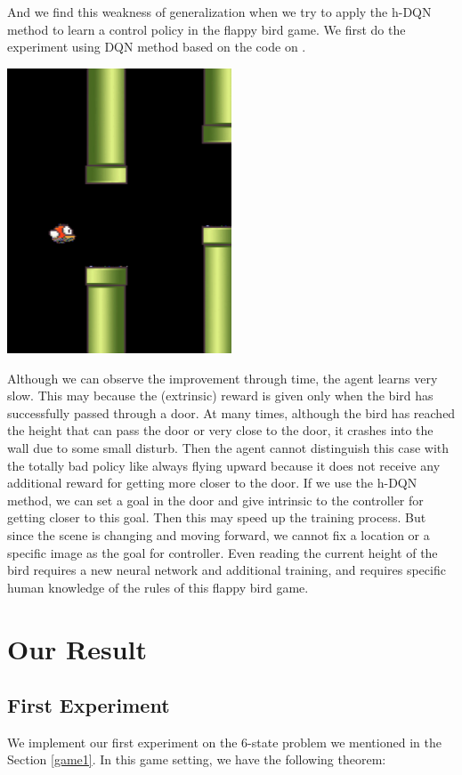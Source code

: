 \documentclass{article}
\begin{document}
\begin{spacing}{1.1}
    And we find this weakness of generalization when we try to apply the h-DQN method to learn a control policy in the flappy bird game. We first do the experiment using DQN method based on the code on \cite{github2}.
    \begin{center}
        \includegraphics[width = 0.5\textwidth]{Fluppy.png}
    \end{center}

    Although we can observe the improvement through time, the agent learns very slow. This may because the (extrinsic) reward is given only when the bird has successfully passed through a door. At many times, although the bird has reached the height that can pass the door or very close to the door, it crashes into the wall due to some small disturb. Then the agent cannot distinguish this case with the totally bad policy like always flying upward because it does not receive any additional reward for getting more closer to the door. If we use the h-DQN method, we can set a goal in the door and give intrinsic to the controller for getting closer to this goal. Then this may speed up the training process. But since the scene is changing and moving forward, we cannot fix a location or a specific image as the goal for controller. Even reading the current height of the bird requires a new neural network and additional training, and requires specific human knowledge of the rules of this flappy bird game.

    \section{Our Result}
    \subsection{First Experiment}
    We implement our first experiment on the 6-state problem we mentioned in the Section \ref{game1}. In this game setting, we have the following theorem:


\end{spacing}
\end{document}
